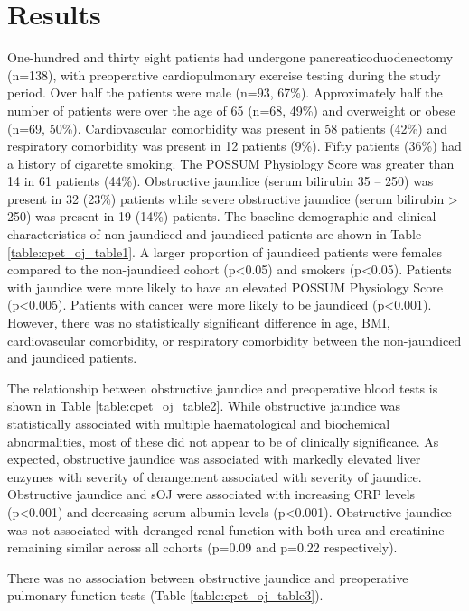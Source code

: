 \section{Results}
One-hundred and thirty eight patients had undergone pancreaticoduodenectomy (n=138), with preoperative cardiopulmonary exercise testing during the study period. Over half the patients were male (n=93, 67\%). Approximately half the number of patients were over the age of 65 (n=68, 49\%) and overweight or obese (n=69, 50\%). Cardiovascular comorbidity was present in 58 patients (42\%) and respiratory comorbidity was present in 12 patients (9\%). Fifty patients (36\%) had a history of cigarette smoking. The POSSUM Physiology Score was greater than 14 in 61 patients (44\%). Obstructive jaundice (serum bilirubin 35 – 250) was present in 32 (23\%) patients while severe obstructive jaundice (serum bilirubin > 250) was present in 19 (14\%) patients. 
The baseline demographic and clinical characteristics of non-jaundiced and jaundiced patients are shown in Table \ref{table:cpet_oj_table1}. A larger proportion of jaundiced patients were females compared to the non-jaundiced cohort (p<0.05) and smokers (p<0.05). Patients with jaundice were more likely to have an elevated POSSUM Physiology Score (p<0.005). Patients with cancer were more likely to be jaundiced (p<0.001). However, there was no statistically significant difference in age, BMI, cardiovascular comorbidity, or respiratory comorbidity between the non-jaundiced and jaundiced patients.



The relationship between obstructive jaundice and preoperative blood tests is shown in Table \ref{table:cpet_oj_table2}. While obstructive jaundice was statistically associated with multiple haematological and biochemical abnormalities, most of these did not appear to be of clinically significance. As expected, obstructive jaundice was associated with markedly elevated liver enzymes with severity of derangement associated with severity of jaundice. Obstructive jaundice and sOJ were associated with increasing CRP levels (p<0.001) and decreasing serum albumin levels (p<0.001). Obstructive jaundice was not associated with deranged renal function with both urea and creatinine remaining similar across all cohorts (p=0.09 and p=0.22 respectively).



There was no association between obstructive jaundice and preoperative pulmonary function tests (Table \ref{table:cpet_oj_table3}).

